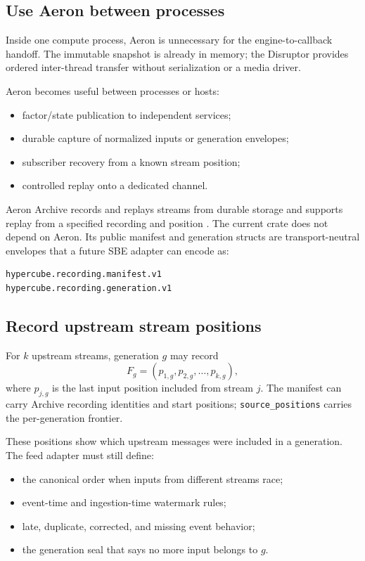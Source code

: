 \documentclass{strategynet-journal}
\begin{document}
\subsection{Use Aeron between processes}

Inside one compute process, Aeron is unnecessary for the engine-to-callback
handoff.  The immutable snapshot is already in memory; the Disruptor provides
ordered inter-thread transfer without serialization or a media driver.

Aeron becomes useful between processes or hosts:
\begin{itemize}
  \item factor/state publication to independent services;
  \item durable capture of normalized inputs or generation envelopes;
  \item subscriber recovery from a known stream position;
  \item controlled replay onto a dedicated channel.
\end{itemize}

Aeron Archive records and replays streams from durable storage and supports
replay from a specified recording and position \cite{aeron}.  The current
crate does not depend on Aeron.  Its public manifest and generation structs are
transport-neutral envelopes that a future SBE adapter can encode as:
\begin{lstlisting}[style=circuit]
hypercube.recording.manifest.v1
hypercube.recording.generation.v1
\end{lstlisting}

\subsection{Record upstream stream positions}

For \(k\) upstream streams, generation \(g\) may record
\[
  F_g=(p_{1,g},p_{2,g},\ldots,p_{k,g}),
\]
where \(p_{j,g}\) is the last input position included from stream \(j\).
The manifest can carry Archive recording identities and start positions;
\texttt{source\_positions} carries the per-generation frontier.

These positions show which upstream messages were included in a generation.
The feed adapter must still define:
\begin{itemize}
  \item the canonical order when inputs from different streams race;
  \item event-time and ingestion-time watermark rules;
  \item late, duplicate, corrected, and missing event behavior;
  \item the generation seal that says no more input belongs to \(g\).
\end{itemize}
\end{document}
